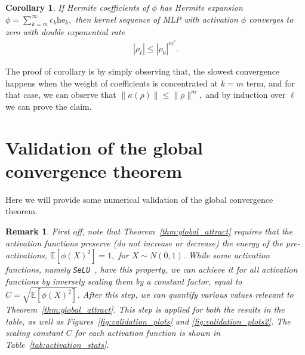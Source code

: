 \documentclass[twoside]{article}
\newcommand{\he}{\mathrm{he}}
\newtheorem{remark}{Remark}
\newtheorem{corollary}{Corollary}
\theoremstyle{definition}
\begin{document}
\begin{corollary}\label{cor:double_exp}
    If Hermite coefficients of $\phi$ has Hermite expansion $\phi = \sum_{k=m}^\infty c_k \he_k,$ then kernel sequence of MLP with activation $\phi$ converges to zero with double exponential rate 
    \begin{align*}
        |\rho_\ell| \le |\rho_0|^{m^\ell}.
    \end{align*}
\end{corollary}

The proof of corollary is by simply observing that, the slowest convergence happens when the weight of coefficients is concentrated at $k=m$ term, and for that case, we can observe that $\|\kappa(\rho)\|\le \|\rho\|^m,$ and by induction over $\ell$ we can prove the claim. 

\section{Validation of the global convergence theorem}\label{sec:experiments}
Here we will provide some numerical validation of the global convergence theorem. 

\begin{remark}\label{rem:act-normalization}
    First off, note that Theorem~\ref{thm:global_attract} requires that the activation functions preserve (do not increase or decrease) the energy of the pre-activations, $\mathbb{E}[\phi(X)^2] = 1,$ for $X\sim N(0,1).$ While some activation functions, namely \texttt{SeLU}~\cite{klambauer2017self}, have this property, we can achieve it for all activation functions by inversely scaling them by a constant factor, equal to $C = \sqrt{\mathbb{E}[\phi(X)^2]}.$ After this step, we can quantify various values relevant to Theorem~\ref{thm:global_attract}. This step is applied for both the results in the table, as well as Figures~\ref{fig:validation_plots} and \ref{fig:validation_plots2}. The scaling constant $C$ for each activation function is shown in Table~\ref{tab:activation_stats}.
\end{remark}
\end{document}
